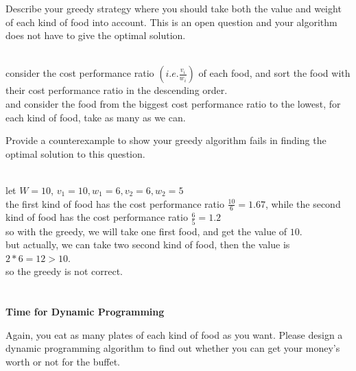 \begin{parts}
	\begin{subparts}
		\subpart[2] Describe your greedy strategy where you should take both the value and weight of each kind of food into account. This is an open question and your algorithm does not have to give the optimal solution.
		\begin{solution}
			\\consider the cost performance ratio $(i.e. \frac{v_i}{w_i})$ of each food, and sort the food with their cost performance ratio in the descending order.\\
			and consider the food from the biggest cost performance ratio to the lowest, for each kind of food, take as many as we can.\\
		\end{solution}

		\subpart[2] Provide a counterexample to show your greedy algorithm fails in finding the optimal solution to this question.
		\begin{solution}
			\\let $W = 10$, $v_1 = 10, w_1 = 6, v_2 = 6, w_2 = 5$\\
			the first kind of food has the cost performance ratio $\frac{10}{6} = 1.67$, while the second kind of food has the cost performance ratio $\frac{6}{5} = 1.2$\\
			so with the greedy, we will take one first food, and get the value of $10$.\\
			but actually, we can take two second kind of food, then the value is $2*6=12 > 10$.\\
			so the greedy is not correct.\\
		\end{solution}

	\end{subparts}

	\newpage

	\part{} \textbf{Time for Dynamic Programming} \par
	Again, you eat as many plates of each kind of food as you want. Please design a dynamic programming algorithm to find out whether you can get your money's worth or not for the buffet. 
	

\end{parts}
